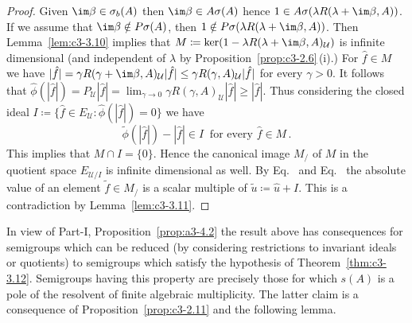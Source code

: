 \begin{proof}
	Given $\im\beta \in \sigma_{b}(A)$ then $\im\beta \in A\sigma(A)$ hence $1 \in A\sigma(\lambda R(\lambda+\im\beta,A))$.
	If we assume that  $\im\beta \notin P\sigma(A)$, then $1 \notin P\sigma(\lambda R(\lambda+\im\beta,A))$.
	Then Lemma~\ref{lem:c3-3.10} implies that $M \coloneqq \ker(1 - \lambda R(\lambda+\im\beta,A)_{\mathcal{U}})$ is infinite dimensional (and independent of\/ $\lambda$ by Proposition~\ref{prop:c3-2.6}\,(i).)
	For $\hat{f} \in M$ we have $|\hat{f}| = \gamma R(\gamma+\im\beta,A)_{\mathcal{U}}|\hat{f}| \leq \gamma R(\gamma,A)_{\mathcal{U}}|\hat{f}|$ for every $\gamma > 0$.
	It follows that $\hat{\phi}(|\hat{f}|) = P_{\mathcal{U}}|\hat{f}| = \lim_{\gamma\to 0}\gamma R(\gamma,A)_{\mathcal{U}}|\hat{f}| \geq |\hat{f}|$.
	Thus considering the closed ideal $I \coloneqq \{\hat{f} \in E_{\mathcal{U}} \colon \hat{\phi}(|\hat{f}|) = 0\}$ we have
	\begin{equation}\label{eq:c3-3.17}
		\tilde{\phi}(|\hat{f}|) - |\hat{f}| \in I \ \text{ for every } \hat{f} \in M\,.
	\end{equation}
	This implies that $M \cap I = \{0\}$. 
	Hence the canonical image $M_/$ of\/ $M$ in the quotient space $E_{\mathcal{U}/{I}}$ is infinite dimensional as well. 
	By Eq.~ and Eq.~ the absolute value of an element $\tilde{f} \in M_/$ is a scalar multiple of\/ $\tilde{u} \coloneqq \hat{u} + I$. 
	This is a contradiction by Lemma~\ref{lem:c3-3.11}.
\end{proof}
In view of Part-I, Proposition~\ref{prop:a3-4.2} the result above has consequences for semigroups which can be reduced (by considering restrictions to invariant ideals or quotients) to semigroups which satisfy the hypothesis of Theorem~\ref{thm:c3-3.12}. 
Semigroups having this property are precisely those for which $s(A)$ is a pole of the resolvent of finite algebraic multiplicity. 
The latter claim is a consequence of Proposition~\ref{prop:c3-2.11} and the following lemma.

